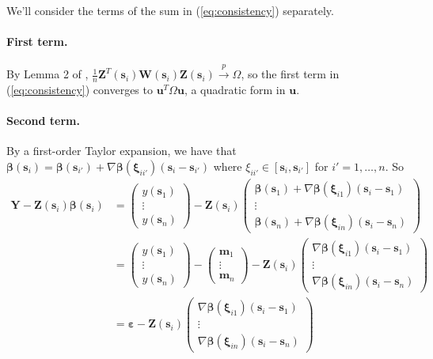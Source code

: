 \documentclass[authoryear, review, 11pt]{elsarticle}
\begin{document}
  We'll consider the terms of the sum in (\ref{eq:consistency}) separately.
  
  \paragraph{First term.} By Lemma 2 of \cite{Sun-Yan-Zhang-Lu-2014}, $\frac{1}{n} \bm{Z}^T(\bm{s}_i) \bm{W}(\bm{s}_i) \bm{Z}(\bm{s}_i) \xrightarrow{p} \Omega$, so the first term in (\ref{eq:consistency}) converges to $\bm{u}^T \Omega \bm{u}$, a quadratic form in $\bm{u}$.
  
  \paragraph{Second term.} By a first-order Taylor expansion, we have that $\bm{\beta}(\bm{s}_i) = \bm{\beta}(\bm{s}_{i'}) + \nabla \bm{\beta}(\bm{\xi}_{ii'}) (\bm{s}_i - \bm{s}_{i'})$ where $\xi_{ii'} \in \left[ \bm{s}_i, \bm{s}_{i'} \right]$ for $i' = 1, \dots, n$. So
  \begin{align*}
    \bm{Y} - \bm{Z}(\bm{s}_i) \bm{\beta}(\bm{s}_i) &= \left( \begin{array}{c} y(\bm{s}_1) \\ \vdots \\ y(\bm{s}_n) \end{array} \right) - \bm{Z}(\bm{s}_i) \left( \begin{array}{c} \bm{\beta}(\bm{s}_1) + \nabla \bm{\beta}(\bm{\xi}_{i1}) (\bm{s}_i - \bm{s}_1) \\ \vdots \\ \bm{\beta}(\bm{s}_n) + \nabla \bm{\beta}(\bm{\xi}_{in}) (\bm{s}_i - \bm{s}_n) \end{array} \right) \\
    &= \left( \begin{array}{c} y(\bm{s}_1) \\ \vdots \\ y(\bm{s}_n) \end{array} \right) - \left( \begin{array}{c} \bm{m}_1 \\ \vdots \\ \bm{m}_n \end{array} \right) - \bm{Z}(\bm{s}_i) \left( \begin{array}{c} \nabla \bm{\beta}(\bm{\xi}_{i1}) (\bm{s}_i - \bm{s}_1) \\ \vdots \\ \nabla \bm{\beta}(\bm{\xi}_{in}) (\bm{s}_i - \bm{s}_n) \end{array} \right)\\
    &= \bm{\varepsilon} - \bm{Z}(\bm{s}_i)  \left( \begin{array}{c} \nabla \bm{\beta}(\bm{\xi}_{i1}) (\bm{s}_i - \bm{s}_1) \\ \vdots \\ \nabla \bm{\beta}(\bm{\xi}_{in}) (\bm{s}_i - \bm{s}_n) \end{array} \right)
  \end{align*}
  
\end{document}
